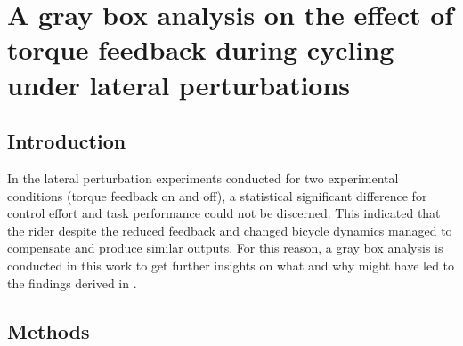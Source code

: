 \chapter{A gray box analysis on the effect of torque feedback during cycling under lateral perturbations} \label{hapticFB}

\section{Introduction}

In the lateral perturbation experiments conducted for two experimental conditions (torque feedback on and off), a statistical significant difference for control effort and task performance  could not be discerned. This indicated that the  rider despite the reduced feedback and changed bicycle dynamics managed to compensate and produce similar outputs. For this reason, a gray box analysis is conducted in this work to get further insights on what and why might have led to the findings derived in \cite{dialynaseffect}.

\section{Methods}

